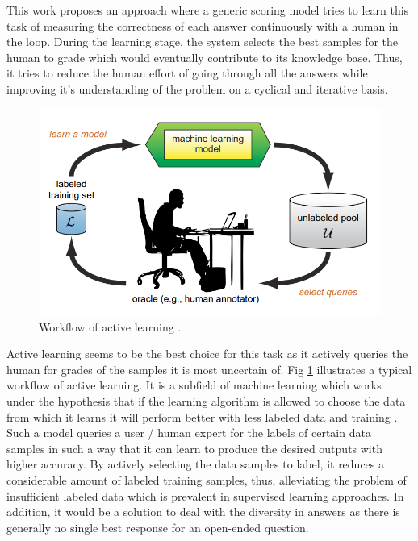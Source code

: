 This work proposes an approach where a generic scoring model tries to learn this task of measuring the correctness of each answer continuously with a human in the loop. During the learning stage, the system selects the best samples for the human to grade which would eventually contribute to its knowledge base. Thus, it tries to reduce the human effort of going through all the answers while improving it's understanding of the problem on a cyclical and iterative basis. \\

\begin{figure}[h!]
	\includegraphics[width=\textwidth]{images/active_learning}
	\caption{Workflow of active learning \cite{Settles2010}.}
	\label{ac_workflow}
\end{figure}

Active learning seems to be the best choice for this task as it actively queries the human for grades of the samples it is most uncertain of. Fig \ref{ac_workflow} illustrates a typical workflow of active learning. It is a subfield of machine learning which works under the hypothesis that if the learning algorithm is allowed to choose the data from which it learns it will perform better with less labeled data and training \cite{Settles2010}. Such a model queries a user / human expert for the labels of certain data samples in such a way that it can learn to produce the desired outputs with higher accuracy. By actively selecting the data samples to label, it reduces a considerable amount of labeled training samples, thus, alleviating the problem of insufficient labeled data which is prevalent in supervised learning approaches. In addition, it would be a solution to deal with the diversity in answers as there is generally no single best response for an open-ended question.

